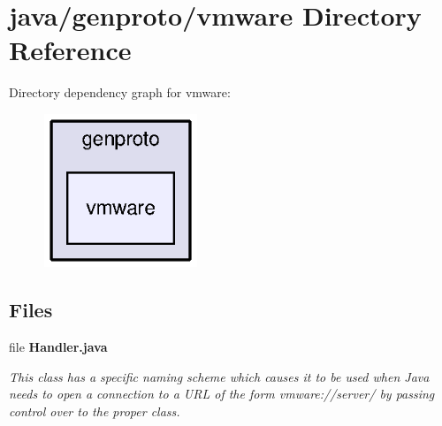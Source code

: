 \section{java/genproto/vmware Directory Reference}
\label{dir_ddc1521b0e0353c4b1a175d3ebf5eedb}
Directory dependency graph for vmware\+:\nopagebreak
\begin{figure}[H]
\begin{center}
\leavevmode
\includegraphics[width=130pt]{dir_ddc1521b0e0353c4b1a175d3ebf5eedb_dep}
\end{center}
\end{figure}
\subsection*{Files}
\begin{DoxyCompactItemize}
\item 
file {\bf Handler.\+java}
\begin{DoxyCompactList}\small\item\em This class has a specific naming scheme which causes it to be used when Java needs to open a connection to a U\+R\+L of the form vmware\+://server/ by passing control over to the proper class. \end{DoxyCompactList}\end{DoxyCompactItemize}
